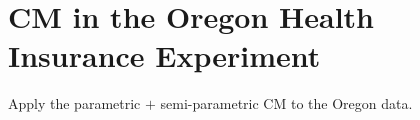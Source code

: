 \section{CM in the Oregon Health Insurance Experiment}
\label{sec:oregon}

Apply the parametric $+$ semi-parametric CM to the Oregon data.
